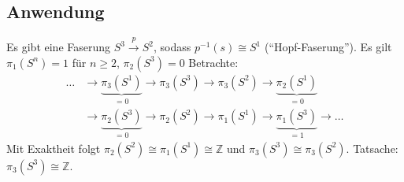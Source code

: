 \subsection{Anwendung} %
\label{sub:1412}
Es gibt eine Faserung $S^3 \xrightarrow{p} S^2 $, sodass $p ^{-1}(s) \cong S^1$ (\enquote{Hopf-Faserung}). Es gilt $\pi_1(S^n)= 1$ für $n \ge 2$, $\pi_2(S^3)= 0$
Betrachte:
\begin{align*}
	\ldots  &\longrightarrow \underbrace{\pi_3(S^1)}_{=0} \longrightarrow \pi_3(S^3) \longrightarrow \pi_3(S^2) \longrightarrow \underbrace{\pi_2(S^1)}_{=0} \\
	&\longrightarrow \underbrace{\pi_2(S^3)}_{=0} \longrightarrow \pi_2(S^2) \longrightarrow \pi_1(S^1) \longrightarrow \underbrace{\pi_1(S^3)}_{=1} \longrightarrow \ldots 
\end{align*}
Mit Exaktheit folgt $\pi_2(S^2) \cong \pi_1(S^1) \cong \mathds{Z}$ und $\pi_3(S^3) \cong \pi_3(S^2)$. Tatsache: $\pi_3(S^3) \cong \mathds{Z}$.
\cleardoubleoddemptypage
{}
\setcounter{page}{1}
\printindex
\listoffigures

